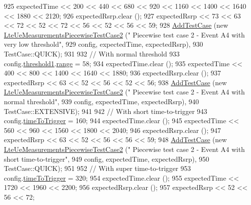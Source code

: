 \begin{DoxyCode}
925   expectedTime << 200 << 440 << 680 << 920 << 1160 << 1400 << 1640 << 1880 << 2120;
926   expectedRsrp.clear ();
927   expectedRsrp << 73 << 63 << 72 << 52 << 72 << 56 << 52 << 56 << 59;
928   \hyperlink{classns3_1_1TestCase_a3718088e3eefd5d6454569d2e0ddd835}{AddTestCase} (\textcolor{keyword}{new} \hyperlink{classLteUeMeasurementsPiecewiseTestCase2}{LteUeMeasurementsPiecewiseTestCase2} (\textcolor{stringliteral}{"
      Piecewise test case 2 - Event A4 with very low threshold"},
929                                                         config, expectedTime, expectedRsrp),
930                TestCase::QUICK);
931 
932   \textcolor{comment}{// With normal threshold}
933   config.\hyperlink{structns3_1_1LteRrcSap_1_1ReportConfigEutra_a8f36bc45a61054920e490be8bf33b4ca}{threshold1}.\hyperlink{structns3_1_1LteRrcSap_1_1ThresholdEutra_abd4950e20a1a93727535e8364bf85b03}{range} = 58;
934   expectedTime.clear ();
935   expectedTime << 400 << 800 << 1400 << 1640 << 1880;
936   expectedRsrp.clear ();
937   expectedRsrp << 63 << 52 << 56 << 52 << 56;
938   \hyperlink{classns3_1_1TestCase_a3718088e3eefd5d6454569d2e0ddd835}{AddTestCase} (\textcolor{keyword}{new} \hyperlink{classLteUeMeasurementsPiecewiseTestCase2}{LteUeMeasurementsPiecewiseTestCase2} (\textcolor{stringliteral}{"
      Piecewise test case 2 - Event A4 with normal threshold"},
939                                                         config, expectedTime, expectedRsrp),
940                TestCase::EXTENSIVE);
941 
942   \textcolor{comment}{// With short time-to-trigger}
943   config.\hyperlink{structns3_1_1LteRrcSap_1_1ReportConfigEutra_aee64b76b166b1beda5bbe1760363ed24}{timeToTrigger} = 160;
944   expectedTime.clear ();
945   expectedTime << 560 << 960 << 1560 << 1800 << 2040;
946   expectedRsrp.clear ();
947   expectedRsrp << 63 << 52 << 56 << 56 << 59;
948   \hyperlink{classns3_1_1TestCase_a3718088e3eefd5d6454569d2e0ddd835}{AddTestCase} (\textcolor{keyword}{new} \hyperlink{classLteUeMeasurementsPiecewiseTestCase2}{LteUeMeasurementsPiecewiseTestCase2} (\textcolor{stringliteral}{"
      Piecewise test case 2 - Event A4 with short time-to-trigger"},
949                                                         config, expectedTime, expectedRsrp),
950                TestCase::QUICK);
951 
952   \textcolor{comment}{// With super time-to-trigger}
953   config.\hyperlink{structns3_1_1LteRrcSap_1_1ReportConfigEutra_aee64b76b166b1beda5bbe1760363ed24}{timeToTrigger} = 320;
954   expectedTime.clear ();
955   expectedTime << 1720 << 1960 << 2200;
956   expectedRsrp.clear ();
957   expectedRsrp << 52 << 56 << 72;

\end{DoxyCode}
